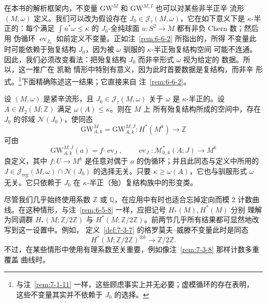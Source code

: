 \begin{remark}\label{rem:7-3-9}
在本书的解析框架内，不变量 $\mathrm{GW}^M$ 和 $\mathrm{GW}^{M,I}$ 也可以对某些非半正辛
流形 $(M,\omega)$ 定义。我们可以改为假设存在
$J_0\in\mathcal J_\tau(M,\omega)$，它在如下意义下是 $\kappa$-半正的：每个满足
$\int u^*\omega\le\kappa$ 的 $J_0$-全纯球面 $u:S^2\to M$ 都有非负 Chern 数；然后用
伪循环 $\operatorname{ev}_{J_0}$ 如前定义不变量。正如注~\ref{rem:6-6-2} 所指出的，所得
不变量此时可能依赖于殆复结构 $J_0$，因为被 $\omega$ 驯服的 $\kappa$-半正殆复结构空间
可能不连通。因此，我们必须改变看法：把殆复结构 $J_0$ 而非辛形式 $\omega$ 视为给定的
数据。所以，这一推广在 凯勒 情形中特别有意义，因为此时首要数据是复结构，而非辛
形式。\footnote{与注~\ref{rem:7-1-11} 一样，这些顾虑事实上并无必要；虚模循环的存在表明，
这些不变量其实并不依赖于 $J_0$ 的选择。}下面精确陈述这一结果；它直接来自
注~\ref{rem:6-6-2}。

设 $(M,\omega)$ 是紧辛流形，且 $J_0\in\mathcal J_\tau(M,\omega)$ 关于 $\omega$ 是
$\kappa$-半正的。设 $A\in H_2(M;\mathbb Z)$ 满足 $\omega(A)\le\kappa$。则在 $M$ 上
所有殆复结构所成的空间中，存在 $J_0$ 的邻域 $\mathcal N(J_0)$，使同态
\[
  \mathrm{GW}^M_{A,k}=\mathrm{GW}^{M;J}_{A,k}:
  H^*(M^k)\longrightarrow\mathbb Z
\]
可由
\[
  \mathrm{GW}^{M;J}_{A,k}(a)
  =f\mathbin{\boldsymbol\cdot}\operatorname{ev}_J,
  \qquad
  \operatorname{ev}_J:\mathcal M^*_{0,k}(A;J)\longrightarrow M^k
\]
良定义，其中 $f:U\to M^k$ 是任意对偶于 $a$ 的伪循环；并且此同态与定义中所用的
$J\in\mathcal J_{\mathrm{reg}}(M,\omega)\cap\mathcal N(J_0)$ 的选择无关。只要
$\kappa\ge\omega(A)$，它也与驯服形式 $\omega$ 无关。它只依赖于 $J_0$ 在
$\kappa$-半正（殆）复结构族中的形变类。
\end{remark}

\begin{remark}\label{rem:7-3-10}
尽管我们几乎始终使用系数 $\mathbb Z$ 或 $\mathbb Q$，在应用中有时也适合忘掉定向而模
$2$ 计数曲线。在这种情形，与注~\ref{rem:6-5-8} 一样，应把记号 $H_*(M),H^*(M)$ 分别
理解为同调群 $H_*(M;\mathbb Z/2\mathbb Z)$ 与
$H^*(M;\mathbb Z/2\mathbb Z)$。前两节几乎所有结果都可显然地改写到这一设置中。例如，
定义~\ref{def:7-3-7} 的格罗莫夫--威滕不变量此时是同态
\[
  H^*(M;\mathbb Z/2\mathbb Z)^{\otimes k}
  \longrightarrow\mathbb Z/2\mathbb Z.
\]
不过，在某些情形中使用有理系数至关重要，例如像注~\ref{rem:7-3-8} 那样计数多重覆盖
曲线时。
\end{remark}
